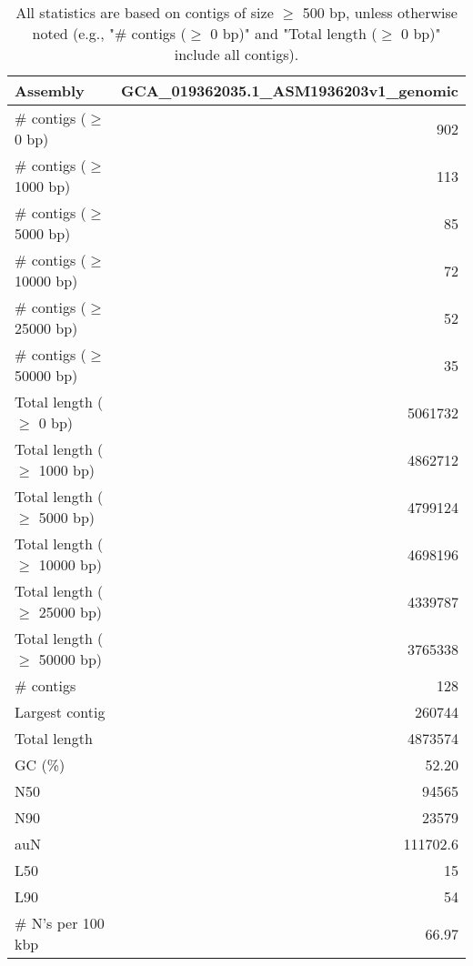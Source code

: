 \documentclass[12pt,a4paper]{article}
\begin{document}
\begin{table}[ht]
\begin{center}
\caption{All statistics are based on contigs of size $\geq$ 500 bp, unless otherwise noted (e.g., "\# contigs ($\geq$ 0 bp)" and "Total length ($\geq$ 0 bp)" include all contigs).}
\begin{tabular}{|l*{1}{|r}|}
\hline
Assembly & GCA\_019362035.1\_ASM1936203v1\_genomic \\ \hline
\# contigs ($\geq$ 0 bp) & 902 \\ \hline
\# contigs ($\geq$ 1000 bp) & 113 \\ \hline
\# contigs ($\geq$ 5000 bp) & 85 \\ \hline
\# contigs ($\geq$ 10000 bp) & 72 \\ \hline
\# contigs ($\geq$ 25000 bp) & 52 \\ \hline
\# contigs ($\geq$ 50000 bp) & 35 \\ \hline
Total length ($\geq$ 0 bp) & 5061732 \\ \hline
Total length ($\geq$ 1000 bp) & 4862712 \\ \hline
Total length ($\geq$ 5000 bp) & 4799124 \\ \hline
Total length ($\geq$ 10000 bp) & 4698196 \\ \hline
Total length ($\geq$ 25000 bp) & 4339787 \\ \hline
Total length ($\geq$ 50000 bp) & 3765338 \\ \hline
\# contigs & 128 \\ \hline
Largest contig & 260744 \\ \hline
Total length & 4873574 \\ \hline
GC (\%) & 52.20 \\ \hline
N50 & 94565 \\ \hline
N90 & 23579 \\ \hline
auN & 111702.6 \\ \hline
L50 & 15 \\ \hline
L90 & 54 \\ \hline
\# N's per 100 kbp & 66.97 \\ \hline
\end{tabular}
\end{center}
\end{table}
\end{document}
